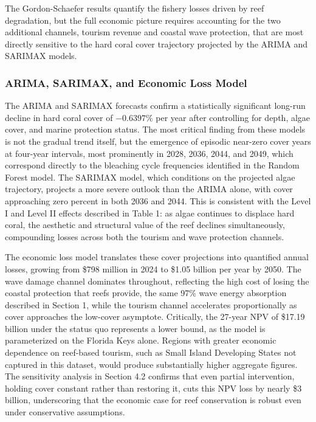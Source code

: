 \documentclass[10pt,letterpaper]{article}
\newcounter{assumption}
\begin{document}
The Gordon-Schaefer results quantify the fishery losses driven by reef degradation, but the full economic picture requires accounting for the two additional channels, tourism revenue and coastal wave protection, that are most directly sensitive to the hard coral cover trajectory projected by the ARIMA and SARIMAX models.

\subsubsection{ARIMA, SARIMAX, and Economic Loss Model}
The ARIMA and SARIMAX forecasts confirm a statistically significant long-run decline in hard coral cover of $-0.6397\%$ per year after controlling for depth, algae cover, and marine protection status. The most critical finding from these models is not the gradual trend itself, but the emergence of episodic near-zero cover years at four-year intervals, most prominently in 2028, 2036, 2044, and 2049, which correspond directly to the bleaching cycle frequencies identified in the Random Forest model. The SARIMAX model, which conditions on the projected algae trajectory, projects a more severe outlook than the ARIMA alone, with cover approaching zero percent in both 2036 and 2044. This is consistent with the Level I and Level II effects described in Table 1: as algae continues to displace hard coral, the aesthetic and structural value of the reef declines simultaneously, compounding losses across both the tourism and wave protection channels.

The economic loss model translates these cover projections into quantified annual losses, growing from \$798 million in 2024 to \$1.05 billion per year by 2050. The wave damage channel dominates throughout, reflecting the high cost of losing the coastal protection that reefs provide, the same 97\% wave energy absorption described in Section 1, while the tourism channel accelerates proportionally as cover approaches the low-cover asymptote. Critically, the 27-year NPV of \$17.19 billion under the status quo represents a lower bound, as the model is parameterized on the Florida Keys alone. Regions with greater economic dependence on reef-based tourism, such as Small Island Developing States not captured in this dataset, would produce substantially higher aggregate figures. The sensitivity analysis in Section 4.2 confirms that even partial intervention, holding cover constant rather than restoring it, cuts this NPV loss by nearly \$3 billion, underscoring that the economic case for reef conservation is robust even under conservative assumptions.
\end{document}

